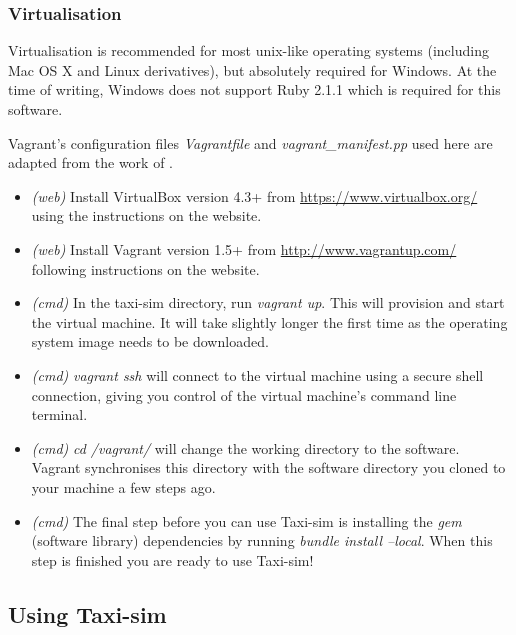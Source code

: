 \subsubsection{Virtualisation}
\label{sec:user_manual:installation:virtualisation}

Virtualisation is recommended for most unix-like operating systems (including
Mac OS X and Linux derivatives), but absolutely required for Windows. At the
time of writing, Windows does not support Ruby 2.1.1 which is required for this
software.

Vagrant's configuration files \textit{Vagrantfile} and
\textit{vagrant\_manifest.pp} used here are adapted from the work of
\textcite{Rails+dev+box}.

\begin{itemize}
  \item \textit{(web)} Install VirtualBox version 4.3+ \parencite{Virtualbox}
        from \url{https://www.virtualbox.org/} using the instructions on the
        website.
  \item \textit{(web)} Install Vagrant version 1.5+ \parencite{Vagrant} from 
        \url{http://www.vagrantup.com/} following instructions on the website.
  \item \textit{(cmd)} In the taxi-sim directory, run \textit{vagrant up}. This
        will provision and start the virtual machine. It will take slightly
        longer the first time as the operating system image needs to be
        downloaded.
  \item \textit{(cmd)} \textit{vagrant ssh} will connect to the virtual machine 
        using a secure shell connection, giving you control of the virtual
        machine's command line terminal.
  \item \textit{(cmd)} \textit{cd /vagrant/} will change the working
        directory to the software. Vagrant synchronises this directory with the
        software directory you cloned to your machine a few steps ago.
  \item \textit{(cmd)} The final step before you can use Taxi-sim is installing
        the \textit{gem} (software library) dependencies by running 
        \textit{bundle install --local}. When this step is finished you are ready to use Taxi-sim!
\end{itemize}


\subsection{Using Taxi-sim}
\label{sec:user_manual:using}

